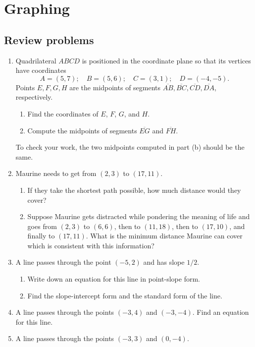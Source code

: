 \section{Graphing}

\subsection{Review problems}

\begin{enumerate}
\item Quadrilateral $ABCD$ is positioned in the coordinate plane so that its vertices have coordinates
\begin{equation*}
A = (5, 7);\quad B = (5, 6);\quad C = (3, 1);\quad D = (-4, -5).
\end{equation*}
Points $E, F, G, H$ are the midpoints of segments $\overline{AB}, \overline{BC}, \overline{CD}, \overline{DA}$, respectively.
\begin{enumerate}
\item Find the coordinates of $E$, $F$, $G$, and $H$.
\item Compute the midpoints of segments $\overline{EG}$ and $\overline{FH}$.
\end{enumerate}
To check your work, the two midpoints computed in part (b) should be the same.
\item Maurine needs to get from $(2,3)$ to $(17,11)$.
\begin{enumerate}
\item If they take the shortest path possible, how much distance would they cover?
\item Suppose Maurine gets distracted while pondering the meaning of life and goes from $(2,3)$ to $(6,6)$, then to $(11, 18)$, then to $(17,10)$, and finally to $(17,11)$. What is the minimum distance Maurine can cover which is consistent with this information? 
\end{enumerate}
\item A line passes through the point $(-5,2)$ and has slope $1/2$.
\begin{enumerate}
\item Write down an equation for this line in point-slope form.
\item Find the slope-intercept form and the standard form of the line.
\end{enumerate}
\item A line passes through the points $(-3,4)$ and $(-3,-4)$. Find an equation for this line.
\item A line passes through the points $(-3,3)$ and $(0,-4)$.

\end{enumerate}
